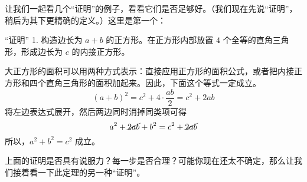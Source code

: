 让我们一起看几个``证明''的例子，看看它们是否足够好。（我们现在先说``证明''，稍后为其下更精确的定义。）这里是第一个：

\begin{proofs}{``证明'' 1.}
    构造边长为 $a+b$ 的正方形。在正方形内部放置 $4$ 个全等的直角三角形，形成边长为 $c$ 的内接正方形。

    \begin{center}
    \end{center}

    大正方形的面积可以用两种方式表示：直接应用正方形的面积公式，或者把内接正方形和四个直角三角形的面积加起来。因此，下面这个等式一定成立。
    \[(a+b)^2=c^2+4\cdot\frac{ab}{2}=c^2+2ab\] 
    将左边表达式展开，然后两边同时消掉同类项可得 
    \[a^2+\cancel{2ab}+b^2=c^2+\cancel{2ab}\] 
    所以，$a^2+b^2=c^2$ 成立。
\end{proofs}

上面的证明是否具有说服力？每一步是否合理？可能你现在还太不确定，那么让我们接着看一下此定理的另一种``证明''。

